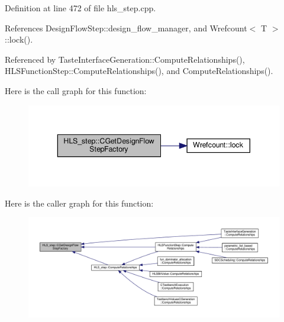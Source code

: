 Definition at line 472 of file hls\+\_\+step.\+cpp.



References Design\+Flow\+Step\+::design\+\_\+flow\+\_\+manager, and Wrefcount$<$ T $>$\+::lock().



Referenced by Taste\+Interface\+Generation\+::\+Compute\+Relationships(), H\+L\+S\+Function\+Step\+::\+Compute\+Relationships(), and Compute\+Relationships().

Here is the call graph for this function\+:
\nopagebreak
\begin{figure}[H]
\begin{center}
\leavevmode
\includegraphics[width=343pt]{da/d27/classHLS__step_a4c959ad5e9f100d5f0b0dd64b9883cd7_cgraph}
\end{center}
\end{figure}
Here is the caller graph for this function\+:
\nopagebreak
\begin{figure}[H]
\begin{center}
\leavevmode
\includegraphics[width=350pt]{da/d27/classHLS__step_a4c959ad5e9f100d5f0b0dd64b9883cd7_icgraph}
\end{center}
\end{figure}
\mbox{\label{classHLS__step_aed0ce8cca9a1ef18e705fc1032ad4de5}} 
